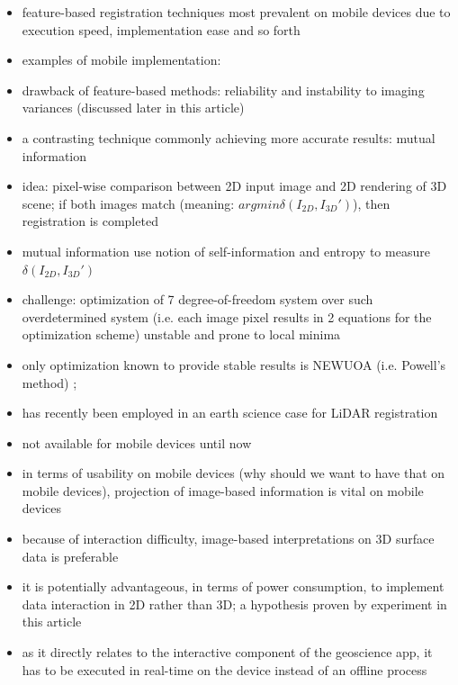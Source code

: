 \documentclass[review]{elsarticle}
\begin{document}
\begin{itemize}
\item feature-based registration techniques most prevalent on mobile devices due to execution speed, implementation ease and so forth
\item examples of mobile implementation: \cite{Gauglitz2014,Sweeny2015,Kehl2017_PHOR,KroehnertXYZ}
\item drawback of feature-based methods: reliability and instability to imaging variances (discussed later in this article)
\item a contrasting technique commonly achieving more accurate results: mutual information
\item idea: pixel-wise comparison between 2D input image and 2D rendering of 3D scene; if both images match (meaning: $argmin \delta(I_{2D}, I_{3D}')$), then registration is completed
\item mutual information \cite{Viola1997} use notion of self-information and entropy to measure $\delta(I_{2D}, I_{3D}')$
\item challenge: optimization of 7 degree-of-freedom system over such overdetermined system (i.e. each image pixel results in 2 equations for the optimization scheme) unstable and prone to local minima
\item only optimization known to provide stable results is NEWUOA (i.e. Powell's method) \cite{Corsini2013}; 
\item has recently been employed in an earth science case for \gls{LiDAR} registration \cite{Guislain2016}
\item not available for mobile devices until now
\end{itemize}

\begin{itemize}
\item in terms of usability on mobile devices (why should we want to have that on mobile devices), projection of image-based information is vital on mobile devices
\item because of interaction difficulty, image-based interpretations on 3D surface data is preferable
\item it is potentially advantageous, in terms of power consumption, to implement data interaction in 2D rather than 3D; a hypothesis proven by experiment in this article
\item as it directly relates to the interactive component of the geoscience app, it has to be executed in real-time on the device instead of an offline process
\end{itemize}
\end{document}
